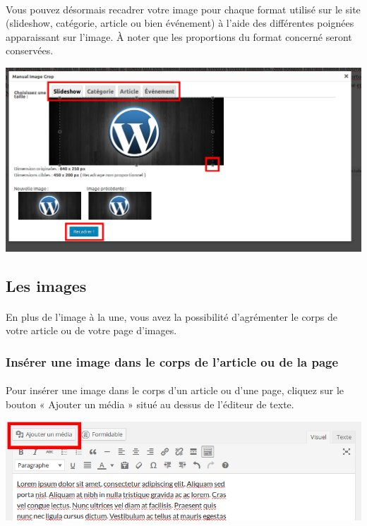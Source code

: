 \documentclass[10pt,a4paper]{article}
\begin{document}
\paragraph{}Vous pouvez désormais recadrer votre image pour chaque format utilisé sur le site (slideshow, catégorie, article ou bien événement) à l'aide des différentes poignées apparaissant sur l'image. À noter que les proportions du format concerné seront conservées.
\begin{center}
\includegraphics[scale=0.3]{img/0101c.png}
\end{center}
\newpage
\subsection{Les images}
\paragraph{}En plus de l'image à la une, vous avez la possibilité d'agrémenter le corps de votre article ou de votre page d'images.
\subsubsection{Insérer une image dans le corps de l'article ou de la page}
\paragraph{}Pour insérer une image dans le corps d'un article ou d'une page, cliquez sur le bouton « Ajouter un média » situé au dessus de l'éditeur de texte.
\begin{center}
\includegraphics[scale=0.3]{img/0102.png}
\end{center}
\end{document}
